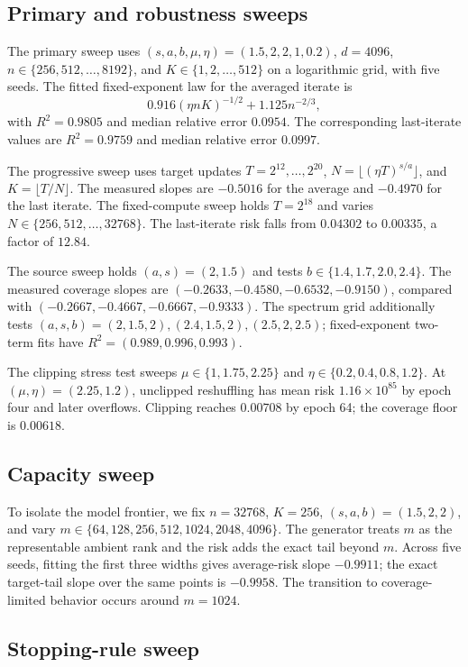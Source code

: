 \documentclass[letterpaper]{article}
\newcommand{\1}{\mathbf 1}
\begin{document}
\subsection{Primary and robustness sweeps}

The primary sweep uses
$(s,a,b,\mu,\eta)=(1.5,2,2,1,0.2)$,
$d=4096$, $n\in\{256,512,\ldots,8192\}$, and
$K\in\{1,2,\ldots,512\}$ on a logarithmic grid, with five seeds. The fitted
fixed-exponent law for the averaged iterate is
\[
0.916(\eta nK)^{-1/2}+1.125n^{-2/3},
\]
with $R^2=0.9805$ and median relative error $0.0954$. The corresponding
last-iterate values are $R^2=0.9759$ and median relative error $0.0997$.

The progressive sweep uses target updates $T=2^{12},\ldots,2^{20}$,
$N=\lfloor(\eta T)^{s/a}\rfloor$, and $K=\lfloor T/N\rfloor$. The measured
slopes are $-0.5016$ for the average and $-0.4970$ for the last iterate. The
fixed-compute sweep holds $T=2^{18}$ and varies
$N\in\{256,512,\ldots,32768\}$. The last-iterate risk falls from $0.04302$ to
$0.00335$, a factor of $12.84$.

The source sweep holds $(a,s)=(2,1.5)$ and tests
$b\in\{1.4,1.7,2.0,2.4\}$. The measured coverage slopes are
$(-0.2633,-0.4580,-0.6532,-0.9150)$, compared with
$(-0.2667,-0.4667,-0.6667,-0.9333)$. The spectrum grid additionally tests
$(a,s,b)=(2,1.5,2),(2.4,1.5,2),(2.5,2,2.5)$; fixed-exponent two-term fits have
$R^2=(0.989,0.996,0.993)$.

The clipping stress test sweeps $\mu\in\{1,1.75,2.25\}$ and
$\eta\in\{0.2,0.4,0.8,1.2\}$. At $(\mu,\eta)=(2.25,1.2)$, unclipped
reshuffling has mean risk $1.16\times10^{85}$ by epoch four and later
overflows. Clipping reaches $0.00708$ by epoch 64; the coverage floor is
$0.00618$.

\subsection{Capacity sweep}

To isolate the model frontier, we fix
$n=32768$, $K=256$, $(s,a,b)=(1.5,2,2)$, and vary
$m\in\{64,128,256,512,1024,2048,4096\}$. The generator treats $m$ as the
representable ambient rank and the risk adds the exact tail beyond $m$. Across
five seeds, fitting the first three widths gives average-risk slope $-0.9911$;
the exact target-tail slope over the same points is $-0.9958$. The transition
to coverage-limited behavior occurs around $m=1024$.

\subsection{Stopping-rule sweep}
\end{document}
